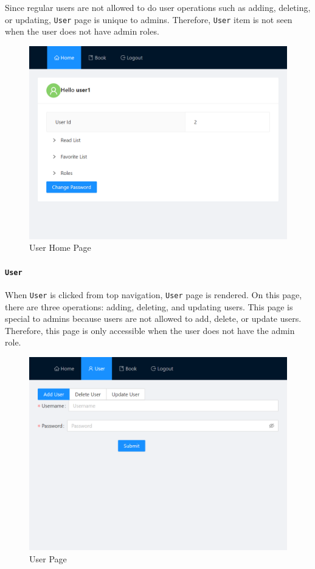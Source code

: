 Since regular users are not allowed to do user operations such as adding, deleting, or updating, \texttt{User} page is unique to admins. Therefore, \texttt{User} item is not seen when the user does not have admin roles.

\begin{figure}[H]
  \centering
  \includegraphics[width=\textwidth]{img/front-end/homepage-user.png}
  \caption{User Home Page}
\end{figure}


\paragraph{\texttt{User}}

When \texttt{User} is clicked from top navigation, \texttt{User} page is rendered. On this page, there are three operations: adding, deleting, and updating users. This page is special to admins because users are not allowed to add, delete, or update users. Therefore, this page is only accessible when the user does not have the admin role.

\begin{figure}[H]
  \centering
  \includegraphics[width=\textwidth]{img/front-end/user.png}
  \caption{User Page}
\end{figure}

